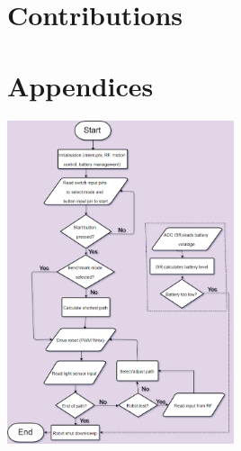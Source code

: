 \documentclass{article}
\begin{document}
\section{Contributions}


\clearpage

\section{Appendices}

\includegraphics[width=0.5\textwidth]{software_flowchart.png}

\vfill
\end{document}
